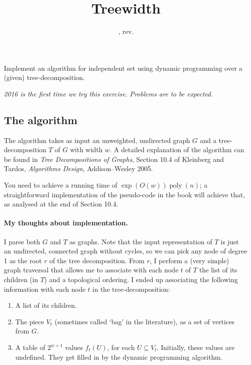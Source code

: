 \documentclass{tufte-handout}
\title{Treewidth}
\date{\GITAuthorDate, rev. \GITAbrHash}
\author{}
\begin{document}
\maketitle

Implement an algorithm for independent set using dynamic programming over a (given) tree-decomposition.

\emph{2016 is the first time we try this exercise. Problems are to be expected.}

\subsection{The algorithm}

The algorithm takes as input an unweighted, undirected graph $G$ and a tree-decomposition $T$ of $G$ with width $w$.
A detailed explanation of the algorithm can be found in \emph{Tree Decompositions of Graphs}, Section 10.4 of Kleinberg and Tardos, \emph{Algorithms Design}, Addison--Wesley 2005.

You need to achieve a running time of $\exp(O(w))\operatorname{poly}(n)$; a straightforward implementation of the pseudo-code in the book will achieve that, as analysed at the end of Section 10.4.

\paragraph{My thoughts about implementation.}
I parse both $G$ and $T$ as graphs.
Note that the input representation of $T$ is just an undirected, connected graph without cycles, so we can pick any node of degree 1 as the root $r$ of the tree decomposition.
From $r$, I perform a (very simple) graph traversal that allows me to associate with each node $t$ of $T$ the list of its children (in $T$) and a topological ordering.
I ended up associating the following information with each node $t$ in the tree-decomposition:
\begin{enumerate}
\item A list of its children.
\item The piece $V_t$ (sometimes called `bag' in the literature), as a set of vertices from $G$.
\item A table of $2^{w+1}$ values $f_t(U)$, for each $U\subseteq V_t$. 
  Initially, these values are undefined.
  They get filled in by the dynamic programming algorithm.
\end{enumerate}
\end{document}
